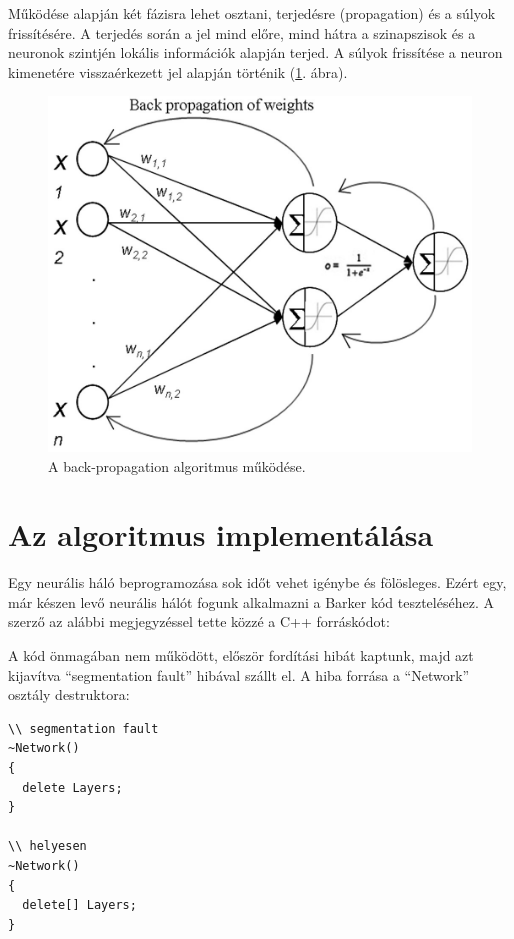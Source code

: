 \documentclass[a4paper]{article}
\begin{document}
Működése alapján két fázisra lehet osztani, terjedésre (propagation) és a súlyok frissítésére. A terjedés során a jel mind előre, mind hátra a szinapszisok és a neuronok szintjén lokális információk alapján terjed. A súlyok frissítése a neuron kimenetére visszaérkezett jel alapján történik (\ref{backpropagation}. ábra).

\begin{figure}
  \centering
  \includegraphics[scale=0.8]{backpropagation}
  \caption{A back-propagation algoritmus működése.}
  \label{backpropagation}
\end{figure}

\section{Az algoritmus implementálása}
Egy neurális háló beprogramozása sok időt vehet igénybe és fölösleges. Ezért egy, már készen levő neurális hálót fogunk alkalmazni a Barker kód teszteléséhez. A szerző az alábbi megjegyzéssel tette közzé a C++ forráskódot:



A kód önmagában nem működött, először fordítási hibát kaptunk, majd azt kijavítva ``segmentation fault'' hibával szállt el. A hiba forrása a ``Network'' osztály destruktora:

\begin{lstlisting}
\\ segmentation fault
~Network()
{
  delete Layers;
}

\\ helyesen
~Network()
{
  delete[] Layers;
}
\end{lstlisting}
\end{document}
